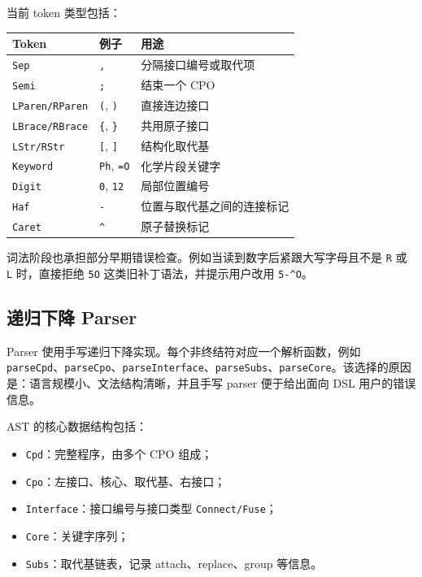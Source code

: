 \documentclass[UTF8,a4paper,11pt]{ctexart}
\begin{document}
当前 token 类型包括：
\begin{table}[h]
\centering
\begin{tabular}{lll}
\toprule
Token & 例子 & 用途 \\
\midrule
\verb|Sep| & \verb|,| & 分隔接口编号或取代项 \\
\verb|Semi| & \verb|;| & 结束一个 CPO \\
\verb|LParen/RParen| & \verb|(|, \verb|)| & 直接连边接口 \\
\verb|LBrace/RBrace| & \verb|{|, \verb|}| & 共用原子接口 \\
\verb|LStr/RStr| & \verb|[|, \verb|]| & 结构化取代基 \\
\verb|Keyword| & \verb|Ph|, \verb|=O| & 化学片段关键字 \\
\verb|Digit| & \verb|0|, \verb|12| & 局部位置编号 \\
\verb|Haf| & \verb|-| & 位置与取代基之间的连接标记 \\
\verb|Caret| & \verb|^| & 原子替换标记 \\
\bottomrule
\end{tabular}
\end{table}

词法阶段也承担部分早期错误检查。例如当读到数字后紧跟大写字母且不是 \verb|R| 或 \verb|L| 时，直接拒绝 \verb|5O| 这类旧补丁语法，并提示用户改用 \verb|5-^O|。

\subsection{递归下降 Parser}

Parser 使用手写递归下降实现。每个非终结符对应一个解析函数，例如 \verb|parseCpd|、\verb|parseCpo|、\verb|parseInterface|、\verb|parseSubs|、\verb|parseCore|。该选择的原因是：语言规模小、文法结构清晰，并且手写 parser 便于给出面向 DSL 用户的错误信息。

AST 的核心数据结构包括：
\begin{itemize}[leftmargin=2em]
  \item \verb|Cpd|：完整程序，由多个 CPO 组成；
  \item \verb|Cpo|：左接口、核心、取代基、右接口；
  \item \verb|Interface|：接口编号与接口类型 \verb|Connect/Fuse|；
  \item \verb|Core|：关键字序列；
  \item \verb|Subs|：取代基链表，记录 attach、replace、group 等信息。
\end{itemize}
\end{document}

